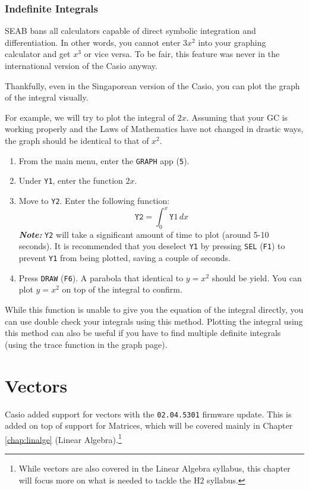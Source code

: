 \documentclass[a5paper]{memoir}
\def\code#1{\texttt{#1}}
\def\note#1{\textcolor[HTML]{109fa9}{\textbf{\textit{Note:}}} #1}
\def\Fone{(\code{F1}) }
\def\fsix{(\code{F6})}
\begin{document}
\subsection{Indefinite Integrals}
SEAB bans all calculators capable of direct symbolic integration and differentiation. In other words, you cannot enter $3x^2$ into your graphing calculator and get $x^3$ or vice versa. To be fair, this feature was never in the international version of the Casio anyway.

Thankfully, even in the Singaporean version of the Casio, you can plot the graph of the integral visually.

For example, we will try to plot the integral of $2x$. Assuming that your GC is working properly and the Laws of Mathematics have not changed in drastic ways, the graph should be identical to that of $x^2$.

\begin{enumerate}
	\item From the main menu, enter the \code{GRAPH} app (\code{5}).
	\item Under \code{Y1}, enter the function $2x$.
	\item Move to \code{Y2}. Enter the following function:
	\begin{equation*}
	\code{Y2}=\int_{0}^{x} \code{Y}1 \, dx
	\end{equation*}
	\note{\code{Y2} will take a significant amount of time to plot (around 5-10 seconds). It is recommended that you deselect \code{Y1} by pressing \code{SEL} \Fone to prevent \code{Y1} from being plotted, saving a couple of seconds.}
	\item Press \code{DRAW} \fsix. A parabola that identical to $y=x^2$ should be yield. You can plot $y=x^2$ on top of the integral to confirm.
\end{enumerate}

While this function is unable to give you the equation of the integral directly, you can use double check your integrals using this method. Plotting the integral using this method can also be useful if you have to find multiple definite integrals (using the trace function in the graph page).

\chapter{Vectors} \label{chap:vectors}

Casio added support for vectors with the \code{02.04.5301} firmware update. This is added on top of support for Matrices, which will be covered mainly in Chapter \ref{chap:linalge} (Linear Algebra).\footnote{While vectors are also covered in the Linear Algebra syllabus, this chapter will focus more on what is needed to tackle the H2 syllabus.}
\end{document}
